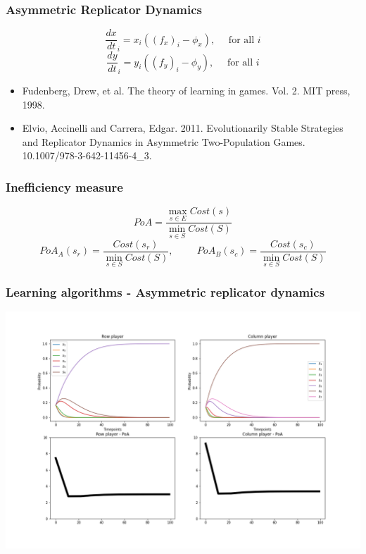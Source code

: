\begin{frame}
    \frametitle{Asymmetric Replicator Dynamics}
    \centering

    \[
        \frac{dx}{dt}_i = x_i((f_x)_i - \phi_x), \quad \text{ for all }i
    \]
    \[
        \frac{dy}{dt}_i = y_i((f_y)_i - \phi_y), \quad \text{ for all }i
    \]
    
    \pause
    \vspace{1cm}
    \begin{itemize}
        \item Fudenberg, Drew, et al. The theory of learning in games. Vol. 2. MIT press, 1998.
        \item Elvio, Accinelli and Carrera, Edgar. 2011. Evolutionarily Stable Strategies and Replicator Dynamics in Asymmetric Two-Population Games. 10.1007/978-3-642-11456-4\_3.
    \end{itemize}
\end{frame}


\begin{frame}
    \frametitle{Inefficiency measure}

    \begin{equation*}
        PoA = \frac{\max_{s \in E} Cost(s)}{\min_{s \in S} Cost(S)}
    \end{equation*}
    \pause
    \footnotesize
    \vspace{1cm}
    \begin{equation*}
        PoA_A(s_r) = \frac{Cost(s_r)}{\min_{s \in S} Cost(S)}, \hspace{1cm} 
        PoA_B(s_c) = \frac{Cost(s_c)}{\min_{s \in S} Cost(S)}
    \end{equation*}
\end{frame}


\begin{frame}
    \frametitle{Learning algorithms - Asymmetric replicator dynamics}

    \includegraphics[scale=0.28]{Bin/ARD_game.png}
\end{frame}


